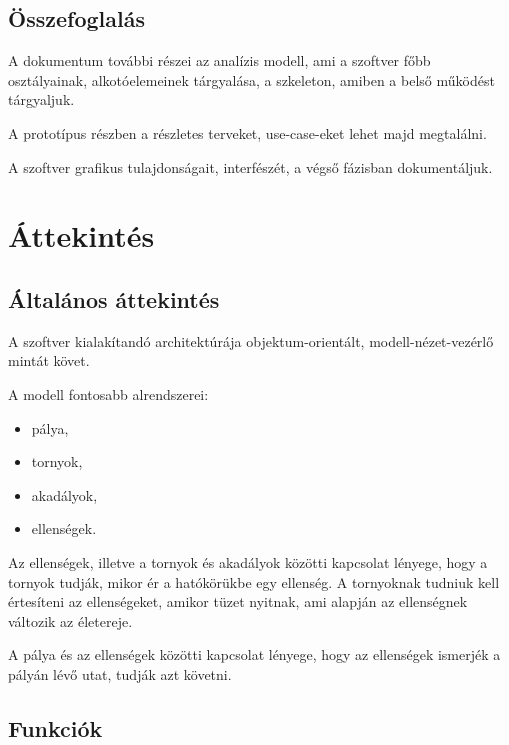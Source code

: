 
\subsection{Összefoglalás}

A dokumentum további részei az analízis modell, ami a szoftver főbb osztályainak, alkotóelemeinek tárgyalása, a szkeleton, amiben a belső működést tárgyaljuk.

A prototípus részben a részletes terveket, use-case-eket lehet majd megtalálni.

A szoftver grafikus tulajdonságait, interfészét, a végső fázisban dokumentáljuk.




\section{Áttekintés}
\subsection{Általános áttekintés}
A szoftver kialakítandó architektúrája objektum-orientált, modell-nézet-vezérlő mintát követ.

A modell fontosabb alrendszerei:%
\begin{itemize}
\item pálya, 
\item tornyok, 
\item akadályok, 
\item ellenségek.
\end{itemize} 
	 
Az ellenségek, illetve a tornyok és akadályok közötti kapcsolat lényege, hogy a tornyok tudják, mikor ér a hatókörükbe egy ellenség. A tornyoknak tudniuk kell értesíteni az ellenségeket, amikor tüzet nyitnak, ami alapján az ellenségnek változik az életereje.
 
A pálya és az ellenségek közötti kapcsolat lényege, hogy az ellenségek ismerjék a pályán lévő utat, tudják azt követni.


\subsection{Funkciók}
